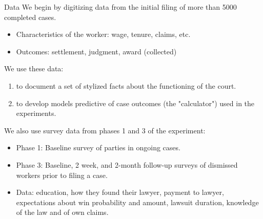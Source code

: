 \documentclass[9pt]{beamer}
\begin{document}
\begin{frame}{Data}
We begin by digitizing data from the initial filing of more than 5000 completed cases.
        \begin{itemize}
            \item Characteristics of the worker: wage, tenure, claims, etc.
            \item Outcomes: settlement, judgment, award (collected)
        \end{itemize}
        \pause
    We use these data:
    \begin{enumerate}
        \item to document a set of stylized facts about the functioning of the court.
        \item to develop models predictive of case outcomes (the "calculator") used in the experiments.
    \end{enumerate} 
\pause
\vspace{2mm}
We also use survey data from phases 1 and 3 of the experiment:
            \begin{itemize}
                \item Phase 1: Baseline survey of parties in ongoing cases.
                \item Phase 3: Baseline, 2 week, and 2-month follow-up surveys of dismissed workers prior to filing a case.
                \item Data: education, how they found their lawyer, payment to lawyer, expectations about win probability and amount, lawsuit duration, knowledge of the law and of own claims.
            \end{itemize}
  
  
       
\end{frame}
\end{document}
